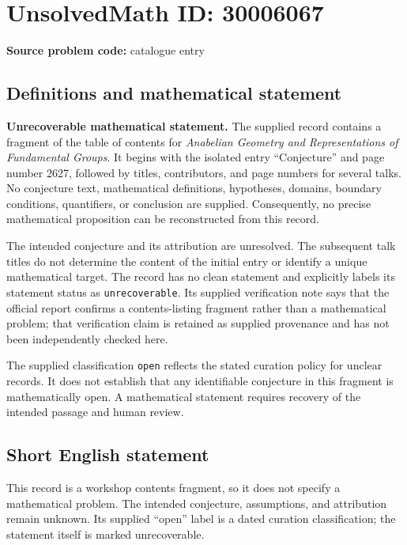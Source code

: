 \documentclass[11pt]{article}
\begin{document}
\section*{UnsolvedMath ID: 30006067}
\textbf{Source problem code:} catalogue entry
\subsection{Definitions and mathematical statement}
\textbf{Unrecoverable mathematical statement.} The supplied record contains a fragment of the table of contents for \emph{Anabelian Geometry and Representations of Fundamental Groups}. It begins with the isolated entry ``Conjecture'' and page number 2627, followed by titles, contributors, and page numbers for several talks. No conjecture text, mathematical definitions, hypotheses, domains, boundary conditions, quantifiers, or conclusion are supplied. Consequently, no precise mathematical proposition can be reconstructed from this record.

The intended conjecture and its attribution are unresolved. The subsequent talk titles do not determine the content of the initial entry or identify a unique mathematical target. The record has no clean statement and explicitly labels its statement status as \texttt{unrecoverable}. Its supplied verification note says that the official report confirms a contents-listing fragment rather than a mathematical problem; that verification claim is retained as supplied provenance and has not been independently checked here.

The supplied classification \texttt{open} reflects the stated curation policy for unclear records. It does not establish that any identifiable conjecture in this fragment is mathematically open. A mathematical statement requires recovery of the intended passage and human review.
\subsection{Short English statement}
This record is a workshop contents fragment, so it does not specify a mathematical problem. The intended conjecture, assumptions, and attribution remain unknown. Its supplied ``open'' label is a dated curation classification; the statement itself is marked unrecoverable.
\end{document}
